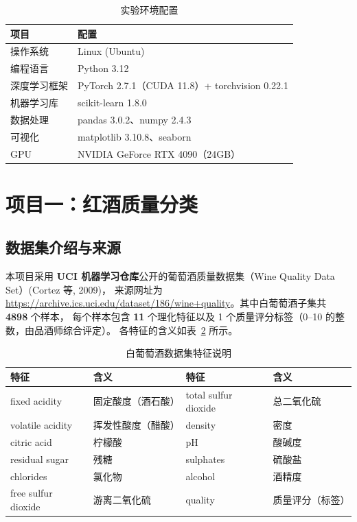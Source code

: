 \documentclass[12pt,a4paper,fontset=fandol]{ctexart}   %
\numberwithin{figure}{section}
\numberwithin{table}{section}
\numberwithin{equation}{section}
\begin{document}
\begin{table}[H]
  \centering
  \caption{实验环境配置}
  \label{tab:env}
  \begin{tabular}{l l}
    \toprule
    项目 & 配置 \\
    \midrule
    操作系统     & Linux (Ubuntu) \\
    编程语言     & Python 3.12 \\
    深度学习框架 & PyTorch 2.7.1（CUDA 11.8）+ torchvision 0.22.1 \\
    机器学习库   & scikit-learn 1.8.0 \\
    数据处理     & pandas 3.0.2、numpy 2.4.3 \\
    可视化       & matplotlib 3.10.8、seaborn \\
    GPU          & NVIDIA GeForce RTX 4090（24GB） \\
    \bottomrule
  \end{tabular}
\end{table}

\section{项目一：红酒质量分类}

\subsection{数据集介绍与来源}
本项目采用 \textbf{UCI 机器学习仓库}公开的葡萄酒质量数据集（Wine Quality Data Set）(Cortez 等, 2009)，
来源网址为 \url{https://archive.ics.uci.edu/dataset/186/wine+quality}。其中白葡萄酒子集共 \textbf{4898} 个样本，
每个样本包含 \textbf{11} 个理化特征以及 1 个质量评分标签（0--10 的整数，由品酒师综合评定）。
各特征的含义如表~\ref{tab:wine_feat} 所示。

\begin{table}[H]
  \centering
  \caption{白葡萄酒数据集特征说明}
  \label{tab:wine_feat}
  \begin{tabular}{l l | l l}
    \toprule
    特征 & 含义 & 特征 & 含义 \\
    \midrule
    fixed acidity & 固定酸度（酒石酸） & total sulfur dioxide & 总二氧化硫 \\
    volatile acidity & 挥发性酸度（醋酸） & density & 密度 \\
    citric acid & 柠檬酸 & pH & 酸碱度 \\
    residual sugar & 残糖 & sulphates & 硫酸盐 \\
    chlorides & 氯化物 & alcohol & 酒精度 \\
    free sulfur dioxide & 游离二氧化硫 & quality & 质量评分（标签） \\
    \bottomrule
  \end{tabular}
\end{table}
\end{document}
